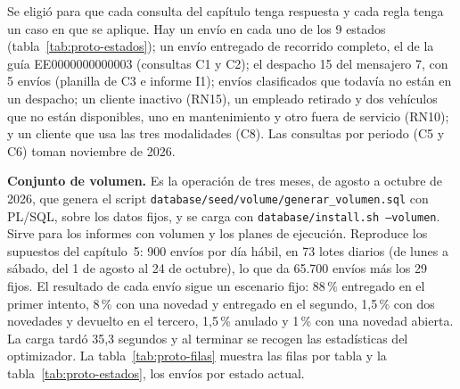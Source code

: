 Se eligió para que cada consulta del capítulo tenga respuesta y cada
regla tenga un caso en que se aplique. Hay un envío en cada uno de los 9
estados (tabla~\ref{tab:proto-estados}); un envío entregado de recorrido
completo, el de la guía EE0000000000003 (consultas C1 y C2); el
despacho 15 del mensajero 7, con 5 envíos (planilla de C3 e informe I1);
envíos clasificados que todavía no están en un despacho; un cliente
inactivo (RN15), un empleado retirado y dos vehículos que no están
disponibles, uno en mantenimiento y otro fuera de servicio (RN10); y un
cliente que usa las tres modalidades (C8). Las consultas por periodo (C5
y C6) toman noviembre de 2026.

\textbf{Conjunto de volumen.} Es la operación de tres meses, de agosto a
octubre de 2026, que genera el script
\texttt{database/seed/volume/generar\_volumen.sql} con PL/SQL, sobre los
datos fijos, y se carga con \texttt{database/install.sh --volumen}. Sirve para
los informes con volumen y los planes de ejecución. Reproduce los supuestos
del capítulo~5: 900 envíos por día hábil, en 73 lotes diarios (de lunes a
sábado, del 1 de agosto al 24 de octubre), lo que da 65.700 envíos más los
29 fijos. El resultado de cada envío sigue un escenario fijo: 88\,\%
entregado en el primer intento, 8\,\% con una novedad y entregado en el
segundo, 1,5\,\% con dos novedades y devuelto en el tercero, 1,5\,\%
anulado y 1\,\% con una novedad abierta. La carga tardó 35,3 segundos y
al terminar se recogen las estadísticas del optimizador. La
tabla~\ref{tab:proto-filas} muestra las filas por tabla y la
tabla~\ref{tab:proto-estados}, los envíos por estado actual.

